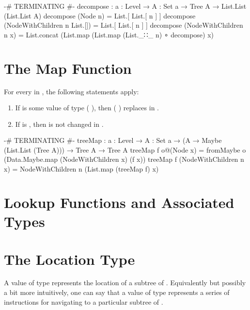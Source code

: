 \documentclass{report}
\begin{document}
\begin{code}
  {-# TERMINATING #-}
  decompose : {a : Level} → {A : Set a} → Tree A → List.List (List.List A)
  decompose (Node n) = List.[ List.[ n ] ]
  decompose (NodeWithChildren n List.[]) = List.[ List.[ n ] ]
  decompose (NodeWithChildren n x) =
    List.concat (List.map (List.map (List._∷_ n) ∘ decompose) x)
\end{code}

\section{The Map Function}
For every   in , the following statements apply:

\begin{enumerate}
  \item If  is some value of type  \AgdaSymbol( \AgdaSymbol), then   \AgdaSymbol( \AgdaSymbol) replaces   in   .\label{enum:treeMap-just}
  \item If   is , then   is not changed in   .\label{enum:treeMap-nothing}
\end{enumerate}

\begin{code}
  {-# TERMINATING #-}
  treeMap : {a : Level} →
            {A : Set a} →
            (A → Maybe (List.List (Tree A))) →
            Tree A →
            Tree A
  treeMap f o@(Node x) =
    fromMaybe o (Data.Maybe.map (NodeWithChildren x) (f x))
  treeMap f (NodeWithChildren n x) =
    NodeWithChildren n (List.map (treeMap f) x)
\end{code}

\section{Lookup Functions and Associated Types}

\section{The Location Type}\label{sec:TreeLocationDefinition}
A value of type   represents the location of a subtree of .  Equivalently but possibly a bit more intuitively, one can say that a value of type   represents a series of instructions for navigating to a particular subtree of .
\end{document}
